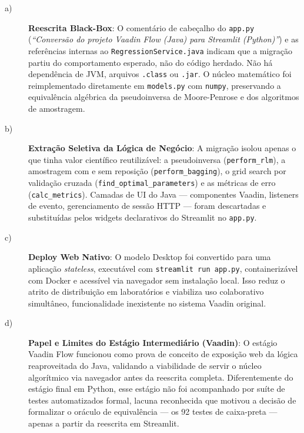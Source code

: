 \begin{description}

\item[a)] \textbf{Reescrita Black-Box}: O comentário de cabeçalho do \texttt{app.py}
(\textit{``Conversão do projeto Vaadin Flow (Java) para Streamlit (Python)''}) e as
referências internas ao \texttt{RegressionService.java} indicam que a migração partiu do
comportamento esperado, não do código herdado. Não há dependência de JVM, arquivos
\texttt{.class} ou \texttt{.jar}. O núcleo matemático foi reimplementado diretamente em
\texttt{models.py} com \texttt{numpy}, preservando a equivalência algébrica da
pseudoinversa de Moore-Penrose e dos algoritmos de amostragem.

\item[b)] \textbf{Extração Seletiva da Lógica de Negócio}: A migração isolou apenas o
que tinha valor científico reutilizável: a pseudoinversa (\texttt{perform\_rlm}), a
amostragem com e sem reposição (\texttt{perform\_bagging}), o grid search por validação
cruzada (\texttt{find\_optimal\_parameters}) e as métricas de erro
(\texttt{calc\_metrics}). Camadas de UI do Java — componentes Vaadin, listeners de
evento, gerenciamento de sessão HTTP — foram descartadas e substituídas pelos widgets
declarativos do Streamlit no \texttt{app.py}.

\item[c)] \textbf{Deploy Web Nativo}: O modelo Desktop foi convertido para uma aplicação
\textit{stateless}, executável com \texttt{streamlit run app.py}, containerizável com
Docker e acessível via navegador sem instalação local. Isso reduz o atrito de distribuição
em laboratórios e viabiliza uso colaborativo simultâneo, funcionalidade inexistente no
sistema Vaadin original.

\item[d)] \textbf{Papel e Limites do Estágio Intermediário (Vaadin)}: O estágio Vaadin
Flow funcionou como prova de conceito de exposição web da lógica reaproveitada do Java,
validando a viabilidade de servir o núcleo algorítmico via navegador antes da reescrita
completa. Diferentemente do estágio final em Python, esse estágio não foi acompanhado por
suíte de testes automatizados formal, lacuna reconhecida que motivou a decisão de
formalizar o oráculo de equivalência --- os 92 testes de caixa-preta --- apenas a partir
da reescrita em Streamlit.

\end{description}

